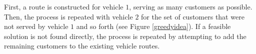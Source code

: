 \documentclass[dissertation,draft*]{aaltoseries}
\newtheorem*{definition}{Definition}
\begin{document}
First, a route is constructed for vehicle $1$, serving as many 
customers as possible. Then, the process is repeated with vehicle $2$ for the set of customers
that were not served by vehicle $1$ and so forth (see Figure \ref{greedyidea}). 
If a feasible solution is not found directly, %
the process is repeated by attempting to add the remaining customers to the existing vehicle routes. 
% 

\end{document}
